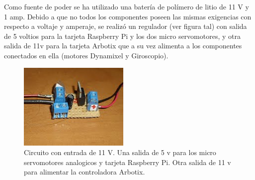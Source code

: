 Como fuente de poder se ha utilizado una batería de polímero de litio de 11 V y 1 amp. Debido a que no todos los componentes poseen las mismas exigencias con respecto a voltaje y amperaje, se realizó un regulador (ver figura tal) con  salida de 5 voltios para la tarjeta Raspberry Pi y los dos micro servomotores, y otra salida de 11v para la tarjeta Arbotix que a su vez alimenta a los componentes conectados en ella (motores Dynamixel y Giroscopio).

\begin{figure}[hbtp]
\centering
\includegraphics[scale=0.8]{imagenes/circuito.jpg}
\caption{Circuito con entrada de 11 V. Una salida de 5 v para los micro servomotores analogicos y tarjeta Raspberry Pi. Otra salida de 11 v para alimentar la controladora Arbotix.   }
\end{figure}

